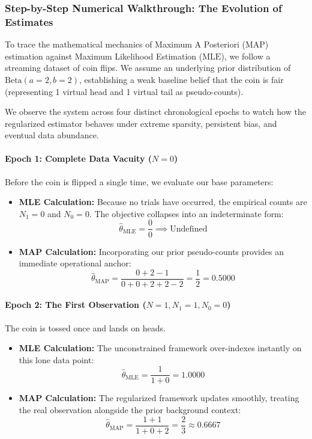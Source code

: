 \documentclass{article}
\begin{document}
\subsubsection{Step-by-Step Numerical Walkthrough: The Evolution of Estimates}

To trace the mathematical mechanics of Maximum A Posteriori ($\text{MAP}$) estimation against Maximum Likelihood Estimation ($\text{MLE}$), we follow a streaming dataset of coin flips. We assume an underlying prior distribution of $\text{Beta}(a=2, b=2)$, establishing a weak baseline belief that the coin is fair (representing 1 virtual head and 1 virtual tail as pseudo-counts). 

We observe the system across four distinct chronological epochs to watch how the regularized estimator behaves under extreme sparsity, persistent bias, and eventual data abundance.

\paragraph{Epoch 1: Complete Data Vacuity ($N = 0$)}
Before the coin is flipped a single time, we evaluate our base parameters:
\begin{itemize}
    \item \textbf{MLE Calculation:} Because no trials have occurred, the empirical counts are $N_1 = 0$ and $N_0 = 0$. The objective collapses into an indeterminate form:
    \begin{equation}
    \hat{\theta}_{\text{MLE}} = \frac{0}{0} \implies \text{Undefined}
    \end{equation}
    \item \textbf{MAP Calculation:} Incorporating our prior pseudo-counts provides an immediate operational anchor:
    \begin{equation}
    \hat{\theta}_{\text{MAP}} = \frac{0 + 2 - 1}{0 + 0 + 2 + 2 - 2} = \frac{1}{2} = \mathbf{0.5000}
    \end{equation}
\end{itemize}

\paragraph{Epoch 2: The First Observation ($N = 1, N_1 = 1, N_0 = 0$)}
The coin is tossed once and lands on heads.
\begin{itemize}
    \item \textbf{MLE Calculation:} The unconstrained framework over-indexes instantly on this lone data point:
    \begin{equation}
    \hat{\theta}_{\text{MLE}} = \frac{1}{1 + 0} = \mathbf{1.0000}
    \end{equation}
    \item \textbf{MAP Calculation:} The regularized framework updates smoothly, treating the real observation alongside the prior background context:
    \begin{equation}
    \hat{\theta}_{\text{MAP}} = \frac{1 + 1}{1 + 0 + 2} = \frac{2}{3} \approx \mathbf{0.6667}
    \end{equation}
\end{itemize}
\end{document}
